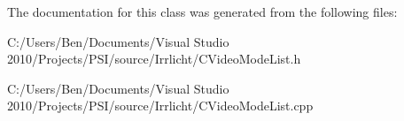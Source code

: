 The documentation for this class was generated from the following files\-:\begin{DoxyCompactItemize}
\item 
C\-:/\-Users/\-Ben/\-Documents/\-Visual Studio 2010/\-Projects/\-P\-S\-I/source/\-Irrlicht/C\-Video\-Mode\-List.\-h\item 
C\-:/\-Users/\-Ben/\-Documents/\-Visual Studio 2010/\-Projects/\-P\-S\-I/source/\-Irrlicht/C\-Video\-Mode\-List.\-cpp\end{DoxyCompactItemize}
